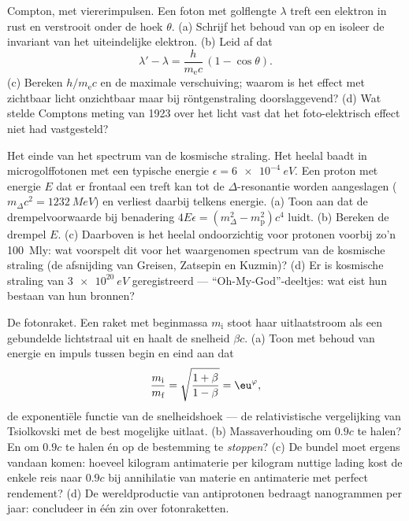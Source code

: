 \begin{exercise}[$\star\star\star$]\label{exo:b3:relativistic-dynamics:10}
Compton, met viererimpulsen. Een foton met golflengte $\lambda$ treft een
elektron in rust en verstrooit onder de hoek $\theta$. (a) Schrijf het
behoud van  op en isoleer de invariant van het uiteindelijke
elektron. (b) Leid af dat
\[
\lambda' - \lambda = \frac{h}{m_{\text{e}}c}\,(1 - \cos\theta) .
\]
(c) Bereken $h/m_{\text{e}}c$ en de maximale verschuiving; waarom is het
effect met zichtbaar licht onzichtbaar maar bij röntgenstraling
doorslaggevend? (d) Wat stelde Comptons meting van 1923 over het licht
vast dat het foto-elektrisch effect niet had vastgesteld?
\end{exercise}

\begin{exercise}[$\star\star\star$]\label{exo:b3:relativistic-dynamics:11}
Het einde van het spectrum van de kosmische straling. Het heelal baadt in
microgolffotonen met een typische energie $\epsilon = \qty{6e-4}{eV}$.
Een proton met energie $E$ dat er frontaal een treft kan tot de
$\Delta$-resonantie worden aangeslagen ($m_\Delta c^2 = \qty{1232}{MeV}$) en verliest daarbij telkens energie. (a) Toon aan dat
de drempelvoorwaarde bij benadering $4E\epsilon =
(m_\Delta^2 - m_{\text{p}}^2)c^4$ luidt. (b) Bereken de drempel $E$. (c) Daarboven is
het heelal ondoorzichtig voor protonen voorbij zo'n \qty{100}{Mly}: wat
voorspelt dit voor het waargenomen spectrum van de kosmische straling (de
afsnijding van Greisen, Zatsepin en Kuzmin)? (d) Er is kosmische straling
van $\qty{3e20}{eV}$ geregistreerd --- ``Oh-My-God''-deeltjes: wat eist
hun bestaan van hun bronnen?
\end{exercise}

\begin{exercise}[$\star\star\star$]\label{exo:b3:relativistic-dynamics:12}
De fotonraket. Een raket met beginmassa $m_{\text{i}}$ stoot haar
uitlaatstroom als een gebundelde lichtstraal uit en haalt de snelheid
$\beta c$. (a) Toon met behoud van energie en impuls tussen begin en eind
aan dat
\[
\frac{m_{\text{i}}}{m_{\text{f}}} =
\sqrt{\frac{1 + \beta}{1 - \beta}} = \eu^{\varphi} ,
\]
de exponentiële functie van de snelheidshoek --- de relativistische
vergelijking van Tsiolkovski met de best mogelijke uitlaat. (b)
Massaverhouding om $0.9c$ te halen? En om $0.9c$ te halen én op de
bestemming te \emph{stoppen}? (c) De bundel moet ergens vandaan komen:
hoeveel kilogram antimaterie per kilogram nuttige lading kost de enkele
reis naar $0.9c$ bij annihilatie van materie en antimaterie met perfect
rendement? (d) De wereldproductie van antiprotonen bedraagt nanogrammen
per jaar: concludeer in één zin over fotonraketten.
\end{exercise}

